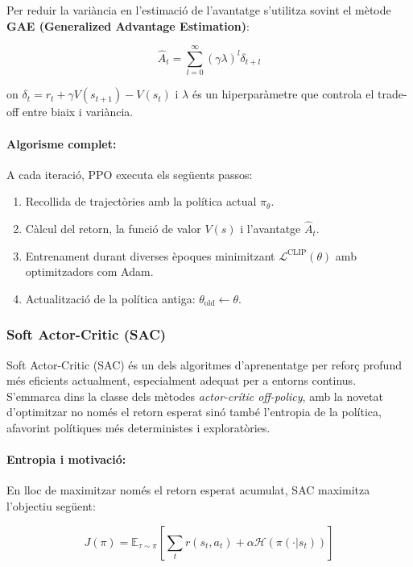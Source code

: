 \documentclass[12pt,a4paper,twoside]{book}
\begin{document}
Per reduir la variància en l'estimació de l'avantatge s'utilitza sovint el mètode \textbf{GAE (Generalized Advantage Estimation)}:

\begin{equation}
\hat{A}_t = \sum_{l=0}^{\infty} (\gamma \lambda)^l \delta_{t+l}
\end{equation}

on $\delta_t = r_t + \gamma V(s_{t+1}) - V(s_t)$ i $\lambda$ és un hiperparàmetre que controla el trade-off entre biaix i variància.

\paragraph{Algorisme complet:}

A cada iteració, PPO executa els següents passos:
\begin{enumerate}
  \item Recollida de trajectòries amb la política actual $\pi_\theta$.
  \item Càlcul del retorn, la funció de valor $V(s)$ i l'avantatge $\hat{A}_t$.
  \item Entrenament durant diverses èpoques minimitzant $\mathcal{L}^{\text{CLIP}}(\theta)$ amb optimitzadors com Adam.
  \item Actualització de la política antiga: $\theta_{\text{old}} \leftarrow \theta$.
\end{enumerate}


\subsubsection{Soft Actor-Critic (SAC)}

Soft Actor-Critic (SAC) és un dels algoritmes d'aprenentatge per reforç profund més eficients actualment, especialment adequat per a entorns continus. S'emmarca dins la classe dels mètodes \textit{actor-crític off-policy}, amb la novetat d'optimitzar no només el retorn esperat sinó també l'entropia de la política, afavorint polítiques més deterministes i exploratòries.

\paragraph{Entropia i motivació:}

En lloc de maximitzar només el retorn esperat acumulat, SAC maximitza l'objectiu següent:

\begin{equation}
J(\pi) = \mathbb{E}_{\tau \sim \pi} \left[ \sum_t r(s_t, a_t) + \alpha \mathcal{H}(\pi(\cdot|s_t)) \right]
\end{equation}
\end{document}
